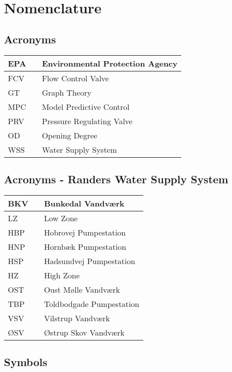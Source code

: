 \chapter{Nomenclature}

\section*{Acronyms}
	
	\begin{tabular}{|l c l|} \hline
		EPA     &&	Environmental Protection Agency					\\ \hline
		FCV     &&	Flow Control Valve								\\ \hline
		GT      &&	Graph Theory									\\ \hline
		MPC 	&&	Model Predictive Control						\\ \hline		
		PRV     &&	Pressure Regulating Valve						\\ \hline
		OD		&&	Opening Degree									\\ \hline
		WSS 	&&	Water Supply System								\\ \hline
	\end{tabular}

\section*{Acronyms - Randers Water Supply System}
	
	\begin{tabular}{|l c l|} \hline
		BKV     &&	Bunkedal Vandværk 					\\ \hline
		LZ      &&	Low Zone												\\ \hline
		HBP     &&	Hobrovej Pumpestation 		\\ \hline
		HNP     &&	Hornbæk Pumpestation 			\\ \hline
		HSP 	&&	Hadsundvej Pumpestation 	\\ \hline		
		HZ      &&	High Zone												\\ \hline
		OST		&&	Oust Mølle Vandværk 				\\ \hline
		TBP 	&&	Toldbodgade Pumpestation 	\\ \hline
		VSV 	&&	Vilstrup Vandværk 					\\ \hline
		ØSV 	&&	Østrup Skov Vandværk 			\\ \hline
	\end{tabular}

\section*{Symbols}


